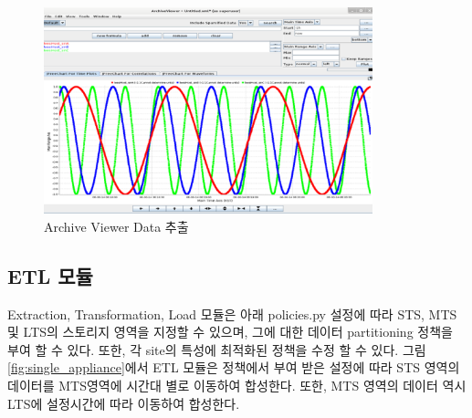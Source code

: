\documentclass[11pt
  , a4paper
  , article
  , oneside
]{memoir}
\begin{document}
\begin{figure}[h!]
	\centering
	\includegraphics[width=0.85\textwidth, height=0.55\textwidth]{./images/image-6.eps}
	\caption{Archive Viewer Data 추출}
	\label{fig:viewer} 
\end{figure}

\subsection*{ETL 모듈}
Extraction, Transformation, Load 모듈은 아래 policies.py 설정에 따라 STS, MTS 및 LTS의 스토리지 영역을 지정할 수 있으며, 그에 대한 데이터 partitioning 정책을 부여 할 수 있다. 또한, 각 site의 특성에 최적화된 정책을 수정 할 수 있다. 그림 \ref{fig:single_appliance}에서 ETL 모듈은 정책에서 부여 받은 설정에 따라 STS 영역의 데이터를 MTS영역에 시간대 별로 이동하여 합성한다. 또한, MTS 영역의 데이터 역시 LTS에 설정시간에 따라 이동하여 합성한다.
\end{document}
